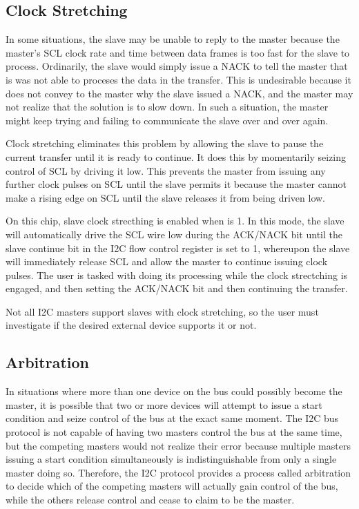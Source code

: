 \subsection{Clock Stretching}

In some situations, the slave may be unable to reply to the master because the master's SCL clock rate and time between data frames is too fast for the slave to process. Ordinarily, the slave would simply issue a NACK to tell the master that is was not able to proceses the data in the transfer. This is undesirable because it does not convey to the master why the slave issued a NACK, and the master may not realize that the solution is to slow down. In such a situation, the master might keep trying and failing to communicate the slave over and over again.

Clock stretching eliminates this problem by allowing the slave to pause the current transfer until it is ready to continue. It does this by momentarily seizing control of SCL by driving it low. This prevents the master from issuing any further clock pulses on SCL until the slave permits it because the master cannot make a rising edge on SCL until the slave releases it from being driven low.

On this chip, slave clock strecthing is enabled when  is 1. In this mode, the slave will automatically drive the SCL wire low during the ACK/NACK bit until the slave continue bit  in the I2C flow control register  is set to 1, whereupon the slave will immediately release SCL and allow the master to continue issuing clock pulses. The user is tasked with doing its processing while the clock strectching is engaged, and then setting the ACK/NACK bit and then continuing the transfer.

Not all I2C masters support slaves with clock stretching, so the user must investigate if the desired external device supports it or not.



\subsection{Arbitration}

In situations where more than one device on the bus could possibly become the master, it is possible that two or more devices will attempt to issue a start condition and seize control of the bus at the exact same moment. The I2C bus protocol is not capable of having two masters control the bus at the same time, but the competing masters would not realize their error because multiple masters issuing a start condition simultaneously is indistinguishable from only a single master doing so. Therefore, the I2C protocol provides a process called arbitration to decide which of the competing masters will actually gain control of the bus, while the others release control and cease to claim to be the master.

